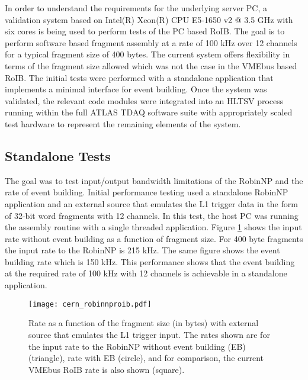 In order to understand the requirements for the underlying server PC, a validation system based on Intel(R) Xeon(R) CPU E5-1650 v2 
@ 3.5 GHz with six cores is being used to perform tests of the PC based RoIB. 
The goal is to perform software based fragment assembly at a rate of 100 kHz over 12 channels for a typical 
fragment size of 400 bytes. The current system offers flexibility in terms of the fragment size allowed which was not the case in the 
VMEbus based RoIB. The initial tests were performed with a standalone application that implements a minimal interface for event building. 
Once the system was validated, the relevant code modules were integrated into an HLTSV process running within the full ATLAS TDAQ 
software suite with appropriately scaled test hardware to represent the remaining elements of the system.

\subsection{Standalone Tests}\label{sec:perf_alone}

The goal was to test input/output bandwidth limitations of the RobinNP and the rate of event building. Initial performance testing used 
a standalone RobinNP application and an external source that emulates the L1 trigger data 
in the form of 32-bit word fragments with 12 channels. In this test, the host PC was running the assembly routine with a single threaded application.  Figure \ref{fig:roib_proto} shows the input rate without 
event building as a function of fragment size. For 400 byte fragments the input rate to the RobinNP is 215 kHz. 
The same figure 
shows the event building rate which is 150 kHz. This performance shows that the event building 
at the required rate of 100 kHz with 12 channels is achievable in a standalone application.  


 \begin{figure}[tbp] %
   \centering
   \texttt{[image: cern\_robinnproib.pdf]}
   \caption{Rate as a function of the fragment size (in bytes) with external source that emulates the L1 trigger input. 
     The rates shown are for the input rate to the RobinNP without event building (EB) (triangle), rate with EB (circle), and 
     for comparison, the current VMEbus RoIB rate is also shown (square).  }
   \label{fig:roib_proto}
 \end{figure}


